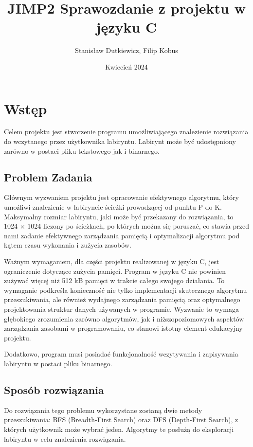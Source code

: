 \documentclass{article}
\title{JIMP2 Sprawozdanie z projektu w języku C}
\author{Stanisław Dutkiewicz, Filip Kobus}
\date{Kwiecień 2024}
\begin{document}
\maketitle

\newpage
\tableofcontents

\newpage

\section{Wstęp}
Celem projektu jest stworzenie programu umożliwiającego znalezienie rozwiązania do wczytanego przez użytkownika labiryntu. Labirynt może być udostępniony zarówno w postaci pliku tekstowego jak i binarnego.

\subsection{Problem Zadania}

Głównym wyzwaniem projektu jest opracowanie efektywnego algorytmu, który umożliwi znalezienie w labiryncie ścieżki prowadzącej od punktu P do K. Maksymalny rozmiar labiryntu, jaki może być przekazany do rozwiązania, to 1024 × 1024 liczony po ścieżkach, po których można się poruszać, co stawia przed nami zadanie efektywnego zarządzania pamięcią i optymalizacji algorytmu pod kątem czasu wykonania i zużycia zasobów.

Ważnym wymaganiem, dla części projektu realizowanej w języku C, jest ograniczenie dotyczące zużycia pamięci. Program w języku C nie powinien zużywać więcej niż 512 kB pamięci w trakcie całego swojego działania. To wymaganie podkreśla konieczność nie tylko implementacji skutecznego algorytmu przeszukiwania, ale również wydajnego zarządzania pamięcią oraz optymalnego projektowania struktur danych używanych w programie. Wyzwanie to wymaga głębokiego zrozumienia zarówno algorytmów, jak i niższopoziomowych aspektów zarządzania zasobami w programowaniu, co stanowi istotny element edukacyjny projektu.

Dodatkowo, program musi posiadać funkcjonalność wczytywania i zapisywania labiryntu w postaci pliku binarnego. 

\subsection{Sposób rozwiązania}

Do rozwiązania tego problemu wykorzystane zostaną dwie metody przeszukiwania: BFS (Breadth-First Search) oraz DFS (Depth-First Search), z których użytkownik może wybrać jeden. Algorytmy te posłużą do eksploracji labiryntu w celu znalezienia rozwiązania.
\end{document}
